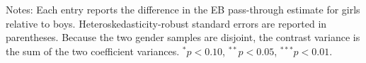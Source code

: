 \begin{table}[!htbp]
\centering
\caption{Gender differences in EB pass-through}
\label{tab:primary-five-eb-gender-contrasts}
\small
{}
\par\medskip
\footnotesize
\begin{minipage}{\textwidth}
Notes: Each entry reports the difference in the EB pass-through estimate for girls relative to boys. Heteroskedasticity-robust standard errors are reported in parentheses. Because the two gender samples are disjoint, the contrast variance is the sum of the two coefficient variances. $^{*}p<0.10$, $^{**}p<0.05$, $^{***}p<0.01$.
\end{minipage}
\end{table}
